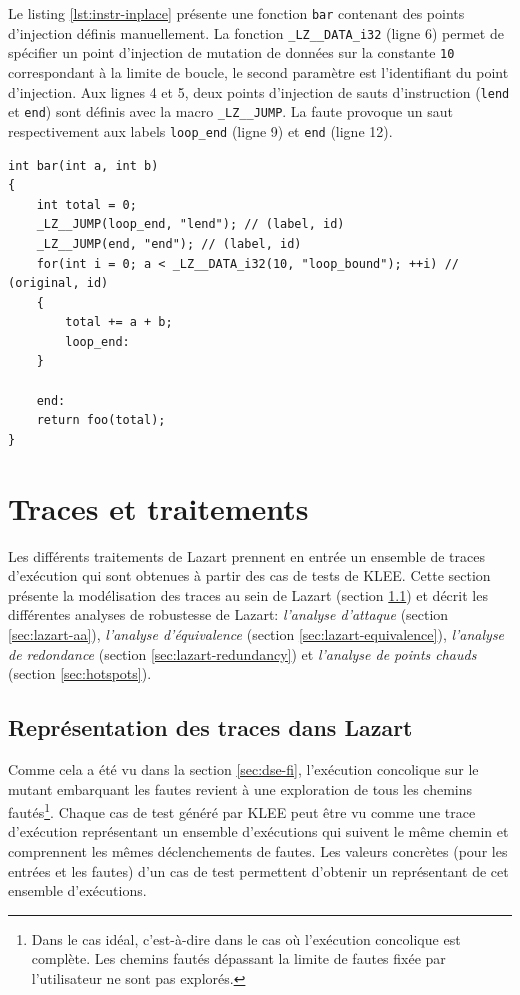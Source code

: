                 Le listing \ref{lst:instr-inplace} présente une fonction \texttt{bar} contenant des points d'injection définis manuellement. La fonction \texttt{\_LZ\_\_DATA\_i32} (ligne 6) permet de spécifier un point d'injection de mutation de données sur la constante \texttt{10} correspondant à la limite de boucle, le second paramètre est l'identifiant du point d'injection.
                Aux lignes 4 et 5, deux points d'injection de sauts d'instruction (\texttt{lend} et \texttt{end}) sont définis avec la macro \texttt{\_LZ\_\_JUMP}. La faute provoque un saut respectivement aux labels \texttt{loop\_end} (ligne 9) et \texttt{end} (ligne 12).
                        
\begin{lstlisting}     
int bar(int a, int b)
{
    int total = 0;
    _LZ__JUMP(loop_end, "lend"); // (label, id)
    _LZ__JUMP(end, "end"); // (label, id)
    for(int i = 0; a < _LZ__DATA_i32(10, "loop_bound"); ++i) // (original, id)
    {
        total += a + b;
        loop_end:
    }
    
    end:
    return foo(total);
}
\end{lstlisting}               

    \section{Traces et traitements}
    \label{sec:lazart-formal}
     
        Les différents traitements de Lazart prennent en entrée un ensemble de traces d'exécution qui sont obtenues à partir des cas de tests de KLEE.
        Cette section présente la modélisation des traces au sein de Lazart (section \ref{sec:lz:traces}) et décrit les différentes analyses de robustesse de Lazart: \textit{l'analyse d'attaque} (section \ref{sec:lazart-aa}), \textit{l'analyse d'équivalence} (section \ref{sec:lazart-equivalence}), \textit{l'analyse de redondance} (section \ref{sec:lazart-redundancy}) et \textit{l'analyse de points chauds} (section \ref{sec:hotspots}).

        \subsection{Représentation des traces dans Lazart}
         \label{sec:lz:traces}

            Comme cela a été vu dans la section \ref{sec:dse-fi}, l'exécution concolique sur le mutant embarquant les fautes revient à une exploration de tous les chemins fautés\footnote{Dans le cas idéal, c'est-à-dire dans le cas où l'exécution concolique est complète. Les chemins fautés dépassant la limite de fautes fixée par l'utilisateur ne sont pas explorés.}. 
            Chaque cas de test généré par KLEE peut être vu comme une trace d'exécution représentant un ensemble d'exécutions qui suivent le même chemin et comprennent les mêmes déclenchements de fautes.
            Les valeurs concrètes (pour les entrées et les fautes) d'un cas de test permettent d'obtenir un représentant de cet ensemble d'exécutions.
            
